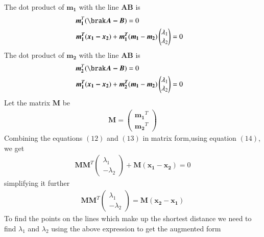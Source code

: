 \documentclass[journal,12pt,twocolumn]{IEEEtran}
\begin{document}
The dot product of $\bm{m_1}$ with the line $\bm{AB}$ is
\begin{align}
    \bm{m_1}^T(\brak\bm{A-B})=0\notag\\
    \bm{m_1^T}(\bm{x_1-x_2})+\bm{m_1^T}(\bm{m_1} & -\bm{m_2})\begin{pmatrix}\lambda_1 \\ \lambda_2\end{pmatrix}=0
\end{align}
The dot product of $\bm{m_2}$ with the line $\bm{AB}$ is\\
\begin{align}
    \bm{m_2}^T(\brak\bm{A-B})=0\notag\\
    \bm{m_1^T}(\bm{x_1-x_2})+\bm{m_2^T}(\bm{m_1} & -\bm{m_2})\begin{pmatrix}\lambda_1 \\ \lambda_2\end{pmatrix}=0
\end{align}
\vspace{3mm}
Let the matrix $\bm{M}$ be\\
\begin{align}
    \bm{M}=\begin{pmatrix}\bm{m_1}^T\\\bm{m_2}^T\end{pmatrix}
\end{align}
Combining the equations $(12)$ and $(13)$ in matrix form,using equation $(14)$, we get\\
\begin{align}
    \bm{M}\bm{M}^T\begin{pmatrix}\lambda_1\\-\lambda_2\end{pmatrix}+\bm{M}\bm{(x_1-x_2)}=0
\end{align}
simplifying it further\\
\begin{align}
    \bm{M}\bm{M}^T\begin{pmatrix}\lambda_1\\-\lambda_2\end{pmatrix}=\bm{M}\bm{(x_2-x_1)}
\end{align}
To find the points on the lines which make up the shortest distance we need to find $\lambda_1$ and $\lambda_2$ using the above expression to get the augmented form\\
\end{document}
